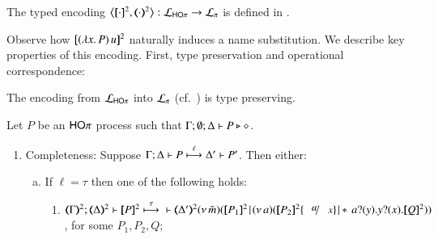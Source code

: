 \documentclass[runningheads]{llncs}
\begin{document}
{\begin{definition}
\label{d:enc:hopitopi}
The typed encoding 
$\enco{\map{\cdot}^{2}, \mapt{\cdot}^{2} %
}: \tyl{L}_{\HOp} \to \tyl{L}_{\sessp}$  
is defined
in . 
\end{definition}


Observe how $[\!\![(\lambda x.\,P)\, {u}]\!\!]^2$ naturally induces a name substitution.
We describe key properties of this encoding. First, type preservation and operational correspondence:

\begin{proposition}
The encoding from $\mathcal{L}_{\mathsf{HO}\pi}$ into $\mathcal{L}_{\pi}$ (cf.~)
is type preserving.
\end{proposition}

\begin{proposition}%
	\label{prop:op_corr_HOp_to_p}
	Let $P$ be an  $\mathsf{HO}\pi$ process such that  $\Gamma; \emptyset; \Delta \vdash P \triangleright \diamond$.
	
\begin{enumerate}[1.]
\item Completeness: Suppose $\Gamma; \Delta \vdash P \stackrel{\ell}{\longmapsto} \Delta' \vdash P'$. Then either:
				\begin{enumerate}[a)]
				\item If $\ell = \tau$ then one of the following holds:
				\begin{enumerate}[-]
					\item	 %
						$
						\horel{\tmap{\Gamma}{2}}{\tmap{\Delta}{2}}{\pmap{P}{2}}
						{\hby{\tau}} \\
						{\tmap{\Delta'}{2}}{}{\newsp{\tilde{m}}{\pmap{P_1}{2} \!\Par\! \newsp{a}
						{\pmap{P_2}{2}\subst{a}{x} \!\Par\!\! \repl{} \binp{a}{y} \binp{y}{x} \pmap{Q}{2}}}}
						$, for some  $P_1, P_2, Q$;


\end{enumerate}
\end{enumerate}
\end{enumerate}
\end{proposition}}
\end{document}
